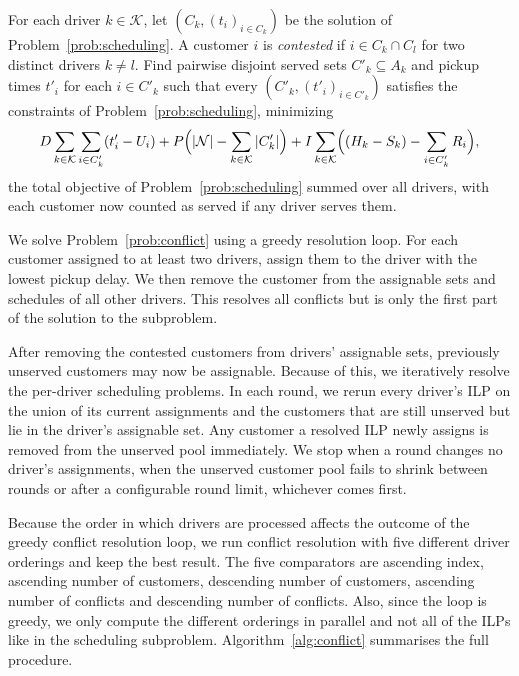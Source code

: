 \begin{problem}
\label{prob:conflict}
For each driver $k \in \mathcal{K}$, let $(C_k, (t_i)_{i \in C_k})$ be the solution of Problem~\ref{prob:scheduling}. A customer $i$ is \emph{contested} if $i \in C_k \cap C_l$ for two distinct drivers $k \ne l$. Find pairwise disjoint served sets $C'_k \subseteq A_k$ and pickup times $t'_i$ for each $i \in C'_k$ such that every $(C'_k, (t'_i)_{i \in C'_k})$ satisfies the constraints of Problem~\ref{prob:scheduling}, minimizing
\[
D \sum_{k \in \mathcal{K}} \sum_{i \in C'_k} (t'_i - U_i)
+ P \Bigl( |\mathcal{N}| - \sum_{k \in \mathcal{K}} |C'_k| \Bigr)
+ I \sum_{k \in \mathcal{K}} \Bigl( (H_k - S_k) - \sum_{i \in C'_k} R_i \Bigr),
\]
the total objective of Problem~\ref{prob:scheduling} summed over all drivers, with each customer now counted as served if any driver serves them.
\end{problem}

We solve Problem~\ref{prob:conflict} using a greedy resolution loop. For each customer assigned to at least two drivers, assign them to the driver with the lowest pickup delay. We then remove the customer from the assignable sets and schedules of all other drivers. This resolves all conflicts but is only the first part of the solution to the subproblem.

After removing the contested customers from drivers' assignable sets, previously unserved customers may now be assignable. Because of this, we iteratively resolve the per-driver scheduling problems. In each round, we rerun every driver's ILP on the union of its current assignments and the customers that are still unserved but lie in the driver's assignable set. Any customer a resolved ILP newly assigns is removed from the unserved pool immediately. We stop when a round changes no driver's assignments, when the unserved customer pool fails to shrink between rounds or after a configurable round limit, whichever comes first.

Because the order in which drivers are processed affects the outcome of the greedy conflict resolution loop, we run conflict resolution with five different driver orderings and keep the best result. The five comparators are ascending index, ascending number of customers, descending number of customers, ascending number of conflicts and descending number of conflicts. Also, since the loop is greedy, we only compute the different orderings in parallel and not all of the ILPs like in the scheduling subproblem. Algorithm~\ref{alg:conflict} summarises the full procedure.

